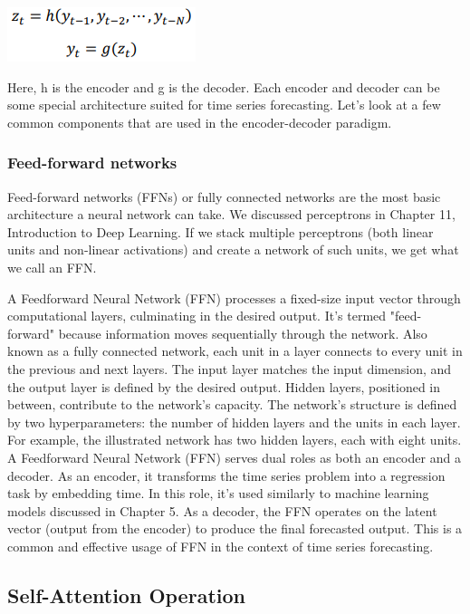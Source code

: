 \documentclass{article}
\begin{document}
\begin{center}
    \includegraphics[width=.5\textwidth]{Picture3.png}
\end{center}

Here, h is the encoder and g is the decoder.
Each encoder and decoder can be some special architecture suited for time series forecasting. Let’s look at a few common components that are used in the encoder-decoder paradigm.

\subsubsection{Feed-forward networks}
Feed-forward networks (FFNs) or fully connected networks are the most basic architecture a neural network can take. We discussed perceptrons in Chapter 11, Introduction to Deep Learning. If we stack multiple perceptrons (both linear units and non-linear activations) and create a network of such units, we get what we call an FFN.

A Feedforward Neural Network (FFN) processes a fixed-size input vector through computational layers, culminating in the desired output. It's termed "feed-forward" because information moves sequentially through the network. Also known as a fully connected network, each unit in a layer connects to every unit in the previous and next layers. The input layer matches the input dimension, and the output layer is defined by the desired output. Hidden layers, positioned in between, contribute to the network's capacity. 
The network's structure is defined by two hyperparameters: the number of hidden layers and the units in each layer. For example, the illustrated network has two hidden layers, each with eight units.
A Feedforward Neural Network (FFN) serves dual roles as both an encoder and a decoder. As an encoder, it transforms the time series problem into a regression task by embedding time. In this role, it's used similarly to machine learning models discussed in Chapter 5. As a decoder, the FFN operates on the latent vector (output from the encoder) to produce the final forecasted output. This is a common and effective usage of FFN in the context of time series forecasting.

\subsection{Self-Attention Operation}
\end{document}
